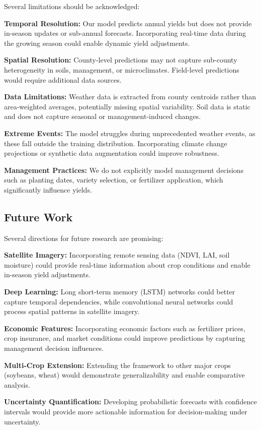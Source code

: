 \documentclass[conference]{IEEEtran}
\begin{document}
Several limitations should be acknowledged:

\textbf{Temporal Resolution:} Our model predicts annual yields but does not provide in-season updates or sub-annual forecasts. Incorporating real-time data during the growing season could enable dynamic yield adjustments.

\textbf{Spatial Resolution:} County-level predictions may not capture sub-county heterogeneity in soils, management, or microclimates. Field-level predictions would require additional data sources.

\textbf{Data Limitations:} Weather data is extracted from county centroids rather than area-weighted averages, potentially missing spatial variability. Soil data is static and does not capture seasonal or management-induced changes.

\textbf{Extreme Events:} The model struggles during unprecedented weather events, as these fall outside the training distribution. Incorporating climate change projections or synthetic data augmentation could improve robustness.

\textbf{Management Practices:} We do not explicitly model management decisions such as planting dates, variety selection, or fertilizer application, which significantly influence yields.

\subsection{Future Work}

Several directions for future research are promising:

\textbf{Satellite Imagery:} Incorporating remote sensing data (NDVI, LAI, soil moisture) could provide real-time information about crop conditions and enable in-season yield adjustments.

\textbf{Deep Learning:} Long short-term memory (LSTM) networks could better capture temporal dependencies, while convolutional neural networks could process spatial patterns in satellite imagery.

\textbf{Economic Features:} Incorporating economic factors such as fertilizer prices, crop insurance, and market conditions could improve predictions by capturing management decision influences.

\textbf{Multi-Crop Extension:} Extending the framework to other major crops (soybeans, wheat) would demonstrate generalizability and enable comparative analysis.

\textbf{Uncertainty Quantification:} Developing probabilistic forecasts with confidence intervals would provide more actionable information for decision-making under uncertainty.
\end{document}
